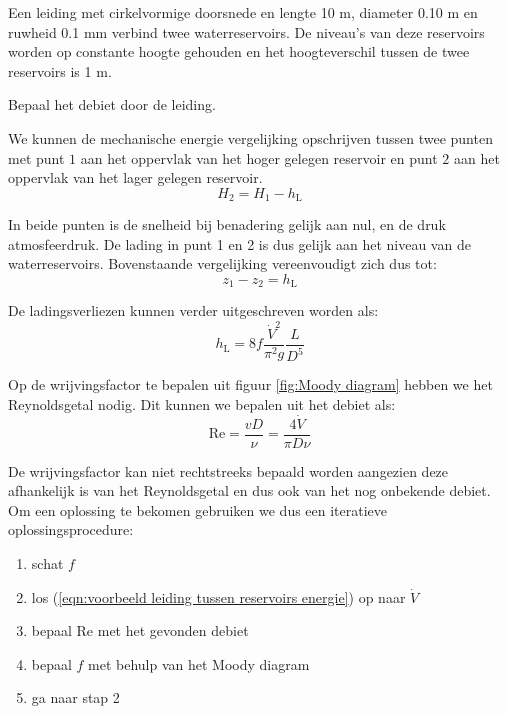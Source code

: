 \begin{voorbeeld}
\label{ex:leiding tussen reservoirs}
Een leiding met cirkelvormige doorsnede en lengte 10 \unit{m}, diameter 0.10 \unit{m} en ruwheid 0.1 \unit{mm} verbind twee waterreservoirs. De niveau's van deze reservoirs worden op constante hoogte gehouden en het hoogteverschil tussen de twee reservoirs is 1 \unit{m}. 

Bepaal het debiet door de leiding.

We kunnen de mechanische energie vergelijking opschrijven tussen twee punten met punt $1$ aan het oppervlak van het hoger gelegen reservoir en punt $2$ aan het oppervlak van het lager gelegen reservoir. 
\begin{equation}
	H_2 = H_1 - h_\mathrm{L} \nonumber
\end{equation}

In beide punten is de snelheid bij benadering gelijk aan nul, en de druk atmosfeerdruk. De lading in punt 1 en 2 is dus gelijk aan het niveau van de waterreservoirs. Bovenstaande vergelijking vereenvoudigt zich dus tot:
\begin{equation}
	z_1 - z_2 = h_\mathrm{L}
	\label{eqn:voorbeeld leiding tussen reservoirs energie}
\end{equation}

De ladingsverliezen kunnen verder uitgeschreven worden als:
\begin{equation}
	h_\mathrm{L} = 8 f \frac{\dot{V}^2}{\pi^2 g}\frac{L}{D^5}
\end{equation}

Op de wrijvingsfactor te bepalen uit figuur \ref{fig:Moody diagram} hebben we het Reynoldsgetal nodig. Dit kunnen we bepalen uit het debiet als:
\begin{equation}
	\mathrm{Re} = \frac{v D}{\nu} = \frac{4 \dot{V}}{\pi D \nu}
\end{equation}

De wrijvingsfactor kan niet rechtstreeks bepaald worden aangezien deze afhankelijk is van het Reynoldsgetal en dus ook van het nog onbekende debiet. Om een oplossing te bekomen gebruiken we dus een iteratieve oplossingsprocedure:
\begin{enumerate}
	\item schat $f$
	\item los (\ref{eqn:voorbeeld leiding tussen reservoirs energie}) op naar $\dot{V}$
	\item bepaal $\mathrm{Re}$ met het gevonden debiet
	\item bepaal $f$ met behulp van het Moody diagram
	\item ga naar stap 2
\end{enumerate}


\end{voorbeeld}
